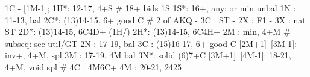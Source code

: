 1C - [1M-1];
1H*: 12-17, 4+S  # 18+ bids 1S
1S*: 16+, any; or min unbal
1N : 11-13, bal
2C*: (13)14-15, 6+ good C  # 2 of AKQ
   - 3C : ST
   - 2X : F1
   - 3X : nat ST
2D*: (13)14-15, 6C4D+
(1H/) 2H*: (13)14-15, 6C4H+ 
2M : min, 4+M  # subseq: see util/GT
2N : 17-19, bal
3C : (15)16-17, 6+ good C 
[2M+1]~[3M-1]: inv+, 4+M, spl
3M : 17-19, 4M bal
3N*: solid (6)7+C
[3M+1]~[4M-1]: 18-21, 4+M, void spl  # 4C : 4M6C+
4M : 20-21, 2425

